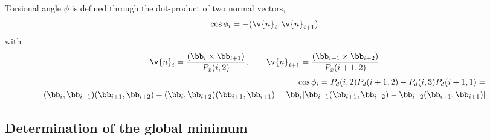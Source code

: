 \documentclass[12pt,a4paper,dvips]{book}
\numberwithin{equation}{section}
\begin{document}
Torsional angle $\phi$ is defined through the dot-product of two normal vectors,
\begin{equation}
  \cos\phi_i=-(\v{n}_i,\v{n}_{i+1})
\end{equation}
with
\begin{equation}
  \v{n}_i=\frac{(\bb_i\times\bb_{i+1})}{P_x(i,2)},\qquad
  \v{n}_{i+1}=\frac{(\bb_{i+1}\times\bb_{i+2})}{P_x(i+1,2)}
\end{equation}
\begin{align}
  \nonumber
  \cos\phi_i=P_d(i,2)P_d(i+1,2)-P_d(i,3)P_d(i+1,1)=\\
  \nonumber
  (\bb_i,\bb_{i+1})(\bb_{i+1},\bb_{i+2})-(\bb_i,\bb_{i+2})(\bb_{i+1},\bb_{i+1})=
  \bb_i[\bb_{i+1}(\bb_{i+1},\bb_{i+2})-\bb_{i+2}(\bb_{i+1},\bb_{i+1})]
  \label{bln-def-tangle}
\end{align}

\subsection{Determination of the global minimum}
\end{document}
